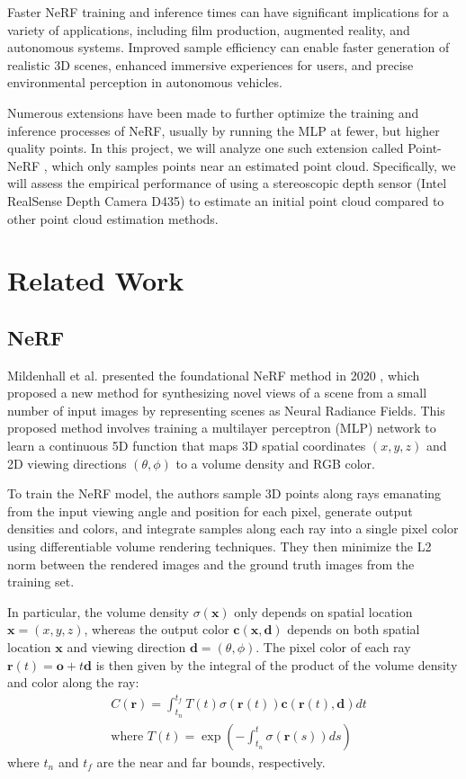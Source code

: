 \documentclass[10pt,twocolumn,letterpaper]{article}
\begin{document}
Faster NeRF training and inference times can have significant implications for a variety of applications, including film production, augmented reality, and autonomous systems. Improved sample efficiency can enable faster generation of realistic 3D scenes, enhanced immersive experiences for users, and precise environmental perception in autonomous vehicles. 

Numerous extensions have been made to further optimize the training and inference processes of NeRF, usually by running the MLP at fewer, but higher quality points. In this project, we will analyze one such extension called Point-NeRF \cite{PointNeRF}, which only samples points near an estimated point cloud. Specifically, we will assess the empirical performance of using a stereoscopic depth sensor (Intel RealSense Depth Camera D435) to estimate an initial point cloud compared to other point cloud estimation methods.



\section{Related Work}
\label{sec:related}

\subsection{NeRF}
Mildenhall et al. presented the foundational NeRF method in 2020 \cite{NeRF}, which proposed a new method for synthesizing novel views of a scene from a small number of input images by representing scenes as Neural Radiance Fields. This proposed method involves training a multilayer perceptron (MLP) network to learn a continuous 5D function that maps 3D spatial coordinates $(x, y, z)$ and 2D viewing directions $(\theta, \phi)$ to a volume density and RGB color. 

To train the NeRF model, the authors sample 3D points along rays emanating from the input viewing angle and position for each pixel, generate output densities and colors, and integrate samples along each ray into a single pixel color using differentiable volume rendering techniques. They then minimize the L2 norm between the rendered images and the ground truth images from the training set. 

\newcommand{\cc}{\textbf{c}}
\newcommand{\rr}{\textbf{r}}
\newcommand{\oo}{\textbf{o}}
\newcommand{\dd}{\textbf{d}}
\newcommand{\xx}{\textbf{x}}
In particular, the volume density $\sigma(\xx)$ only depends on spatial location $\xx = (x, y, z)$, whereas the output color $\cc(\xx, \dd)$ depends on both spatial location $\xx$ and viewing direction $\dd = (\theta, \phi)$. The pixel color of each ray $\rr(t) = \oo + t\dd$ is then given by the integral of the product of the volume density and color along the ray:
\begin{align*}
  &C(\rr) = \int_{t_n}^{t_f} T(t) \sigma(\rr(t)) \cc(\rr(t), \dd) dt 
  \tag{1}\\
  &\text{where } T(t) = \exp\left(-\int_{t_n}^{t} \sigma(\rr(s)) ds\right)
\end{align*}
where $t_n$ and $t_f$ are the near and far bounds, respectively. 
\end{document}

